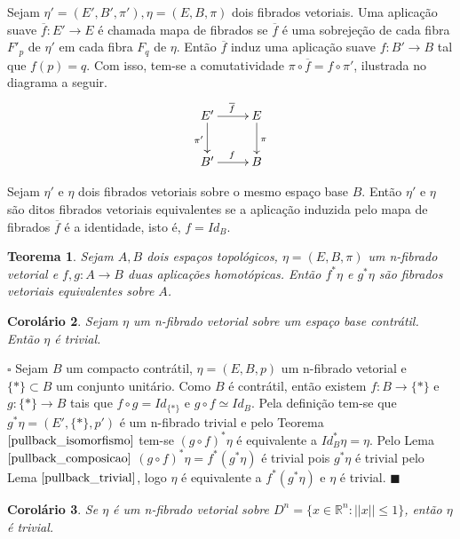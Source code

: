 \documentclass[12pt]{book}
\newtheorem{teorema}{Teorema}[section]
\newtheorem{corolario}[teorema]{Corolário}
\newenvironment{prova}[1]{$\square$ #1}{\hfill$\blacksquare$}
\newcommand{\norma}[1]{||#1||}
\newcommand{\real}[1]{\mathbb{R}^{#1}}
\begin{document}
	Sejam $ \eta'=(E',B',\pi'), \eta=(E,B,\pi)$ dois fibrados vetoriais.  Uma aplicação suave $\overline{f}:E'\to E$ é chamada mapa de fibrados se $\overline{f}$ é uma sobrejeção de cada fibra $F'_{p}$ de $\eta'$ em cada fibra $F_{q}$ de $\eta$. Então $\overline{f}$ induz uma aplicação suave $f:B'\to B$ tal que $f(p)=q$. Com isso, tem-se a comutatividade $\pi\circ \overline{f} = f\circ\pi'$, ilustrada no diagrama a seguir. 
	$$
	\xymatrix{
		E'\ar[d]_{\pi'}\ar[r]^{\overline{f}} & E\ar[d]^{\pi}
		\\
		B'\ar[r]^{f} & B
	}
	$$
	
	
	Sejam $\eta'$ e $\eta$ dois fibrados vetoriais sobre o mesmo espaço base $B$. Então $\eta'$ e $\eta$ são ditos fibrados vetoriais equivalentes se a aplicação induzida pelo mapa de fibrados $\overline{f}$ é a identidade, isto é, $f=Id_{B}$.
	
	\begin{teorema}\label{pullback_isomorfismo}
		Sejam $A, B$ dois espaços topológicos, $\eta=(E, B, \pi)$ um n-fibrado vetorial e $f,g: A\to B$ duas aplicações homotópicas. Então $f^{*}\eta $ e $g^{*}\eta$ são fibrados vetoriais equivalentes sobre $A$.
	\end{teorema}
	
	\begin{corolario}\label{pullback_contratil}
		Sejam $\eta$ um n-fibrado vetorial sobre um espaço base contrátil. Então $\eta$ é trivial.
	\end{corolario}
	\begin{prova}
		Sejam $B$ um compacto contrátil, $\eta=(E, B, p)$ um n-fibrado vetorial e $\{*\} \subset B$ um conjunto unitário. Como $B$ é contrátil, então existem $f:B\to \{*\}$ e $g:\{*\}\to B$ tais que $f\circ g = Id_{\{*\}}$ e $g\circ f \simeq Id_{B}$. Pela definição tem-se que $g^{*}\eta = (E', \{*\}, p')$ é um n-fibrado trivial e pelo Teorema $\ref{pullback_isomorfismo}$ tem-se $(g\circ f)^{*}\eta $ é equivalente a $ Id_{B}^{*}\eta = \eta$. Pelo Lema $\ref{pullback_composicao}$ $(g\circ f)^{*}\eta = f^{*}(g^{*}\eta) $ é trivial pois $g^{*}\eta$ é trivial pelo Lema $\ref{pullback_trivial}$, logo $ \eta $ é equivalente a $f^{*}(g^{*}\eta)$ e $\eta$ é trivial.
	\end{prova}
	
	\begin{corolario}\label{corolario_fibrado_sobre_Dn}
		Se $\eta$ é um n-fibrado vetorial sobre $D^{n} = \{ x\in \real{n}:\norma{x}\leq 1\}$, então $\eta$ é trivial.
	\end{corolario}
\end{document}

